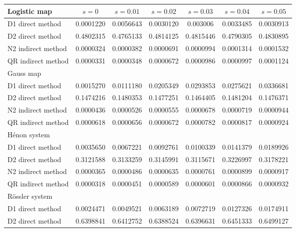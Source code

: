 \begin{table}[ht!]
\centering
\begin{adjustbox}{width=\textwidth}
\begin{tabular}{l|cccccc}
\hline 
Logistic map&  $s=0$      & $s=0.01$  & $s=0.02$  & $s=0.03$      & $s=0.04$  & $s=0.05$  \\ \hline 
D1 direct method        & 0.0001220 & 0.0056643 & 0.0030120 & 0.003006 & 0.0033485 & 0.0030913 \\ 
D2 direct method          & 0.4802315 & 0.4765133 & 0.4814125 & 0.4815446 & 0.4790305 & 0.4830895\\ 
N2 indirect method      & 0.0000324 & 0.0000382 & 0.0000691 & 0.0000994 & 0.0001314 & 0.0001532 \\ 
QR indirect method       & 0.0000331 & 0.0000348 & 0.0000672 & 0.0000986 & 0.0000997 & 0.0001124 \\  \hline
Gauss map&        &   &   &       &   &   \\ \hline 
D1 direct method        & 0.0015270 & 0.0111180 & 0.0205349 & 0.0293853 & 0.0275621 & 0.0336681 \\ 
D2 direct method        & 0.1474216 & 0.1480353 & 0.1477251 & 0.1464405 & 0.1481204 & 0.1476371\\ 
N2 indirect method      & 0.0000436 & 0.0000526 & 0.0000555 & 0.0000678 & 0.0000719 & 0.0000944 \\ 
QR indirect method      & 0.0000618 & 0.0000656 & 0.0000672 & 0.0000782 & 0.0000817 & 0.0000924 \\  \hline
H\'enon  system&        &   &   &       &   &   \\ \hline 
D1 direct method        & 0.0035650 & 0.0067221 & 0.0092761 & 0.0100339 & 0.0141379 & 0.0189926 \\ 
D2 direct method        & 0.3121588 & 0.3133259 & 0.3145991 & 0.3115671 & 0.3226997 & 0.3178221\\ 
N2 indirect method      & 0.0000365 & 0.0000486 & 0.0000635 & 0.0000761 & 0.0000899 & 0.0000917 \\ 
QR indirect method      & 0.0000318 & 0.0000451 & 0.0000589 & 0.0000601 & 0.0000866 & 0.0000932 \\ \hline
R\"ossler  system&        &   &   &       &   &   \\ \hline 
D1 direct method        & 0.0024471& 0.0049521 & 0.0063189 & 0.0072719 & 0.0127326 & 0.0174911 \\ 
D2 direct method        & 0.6398841 & 0.6412752 & 0.6388524 & 0.6396631 & 0.6451333 & 0.6499127\\ 

\end{tabular}
\end{adjustbox}
\end{table}
